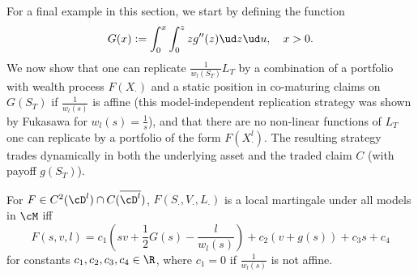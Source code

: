 \documentclass[11pt]{article}
\begin{document}
For a final example in this section, we start by defining the function
\begin{equation}
\label{MFIL vanilla function}
G(x) := \int_0^{x} \int_0^z z g^{\prime\prime}(z) \ud z \ud u, \quad x > 0.
\end{equation}
We now show that one can replicate $\frac{1}{w_l(S_T)} L_T$ by a combination of a portfolio with wealth process $F(X_\cdot)$ and a static position in co-maturing claims on $G(S_T)$ if $\frac{1}{w_l(s)}$ is affine (this model-independent replication strategy was shown by Fukasawa \cite{Fukasawa} for $w_l(s) = \frac{1}{s}$), and that there are no non-linear functions of $L_T$ one can replicate by a portfolio of the form $F(X^l_\cdot)$. The resulting strategy trades dynamically in both the underlying asset and the traded claim $C$ (with payoff $g(S_T)$).

\begin{proposition}
\label{proposition: MFIL}
For $F \in C^2(\cD^l) \cap C(\overline{\cD^l})$, $F(S_\cdot, V_\cdot, L_\cdot)$ is a local martingale under all models in $\cM$ iff
\begin{equation}
\label{MFIL}
F(s, v, l) = c_1 \left( s v + \frac{1}{2} G(s) - \frac{l}{w_l(s)} \right) + c_2 (v + g(s)) + c_3 s + c_4
\end{equation}
for constants $c_1, c_2, c_3, c_4 \in \R$, where $c_1 = 0$ if $\frac{1}{w_l(s)}$ is not affine.
\end{proposition}
\end{document}
